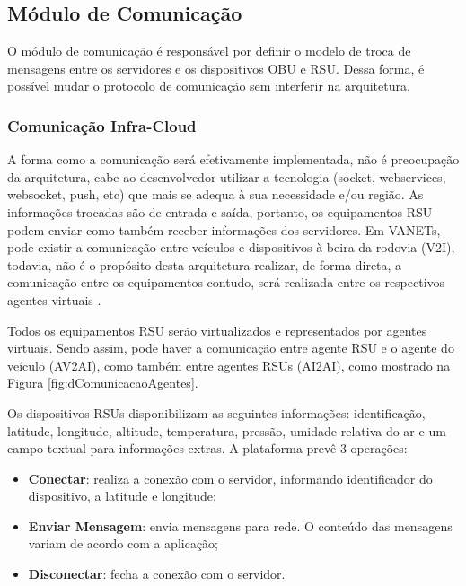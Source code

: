 \documentclass[
	12pt,				%
	oneside,			%
	a4paper,			%
	english,			%
	brazil				%
	]{abntex2ppgsi}
\begin{document}
\subsection{Módulo de Comunicação}

O módulo de comunicação é responsável por definir o modelo de troca de mensagens entre os servidores e os dispositivos  OBU e RSU. Dessa forma, é possível mudar o protocolo de comunicação sem interferir na arquitetura. 

\subsubsection{Comunicação Infra-Cloud}

A forma como a comunicação será efetivamente implementada, não é preocupação da arquitetura, cabe ao desenvolvedor utilizar a tecnologia (socket, webservices, websocket, push, etc) que mais se adequa à sua necessidade e/ou região. As informações trocadas são de entrada e saída, portanto, os equipamentos RSU podem enviar como também receber informações dos servidores. Em VANETs, pode existir a comunicação entre veículos e dispositivos à beira da rodovia (V2I), todavia, não é o propósito desta arquitetura realizar, de forma direta, a comunicação entre os equipamentos contudo, será realizada entre os respectivos agentes virtuais . 

Todos os equipamentos RSU serão virtualizados e representados por agentes virtuais. Sendo assim, pode haver a comunicação entre agente RSU e o agente do veículo (AV2AI), como também entre agentes RSUs (AI2AI), como mostrado na Figura \ref{fig:dComunicacaoAgentes}.

Os dispositivos RSUs disponibilizam as seguintes informações: identificação, latitude, longitude, altitude, temperatura, pressão, umidade relativa do ar e um campo textual para informações extras. A plataforma prevê  3 operações:

\begin{itemize}
	\item{\textbf{Conectar}: realiza a conexão com o servidor, informando identificador do dispositivo, a latitude e longitude;}	
	\item{\textbf{Enviar Mensagem}: envia mensagens para rede. O conteúdo das mensagens variam de acordo com a aplicação;}	
	\item{\textbf{Disconectar}: fecha a conexão com o servidor.}	
\end{itemize} 
\end{document}
